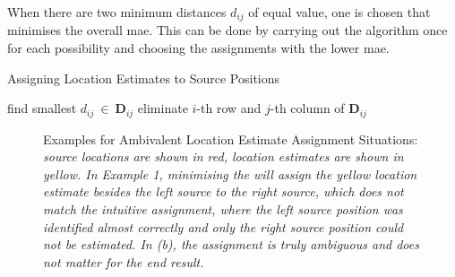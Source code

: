When there are two minimum distances $d_{ij}$ of equal value, one is chosen that minimises the overall \gls{mae}. This can be done by carrying out the algorithm once for each possibility and choosing the assignments with the lower \gls{mae}.
\begin{algorithm}[!htb]
\caption{Assigning Location Estimates to Source Positions}
\label{alg:assignment}
\begin{algorithmic}
    \State find smallest $d_{ij}\ \in\ \bm{D}_{ij}$ 
    \State eliminate $i$-th row and $j$-th column of $\bm{D}_{ij}$
    \EndWhile
\end{algorithmic}
\end{algorithm}

\begin{figure}[H]
	\setlength{\figureheight}{6cm}
%        

\iftoggle{quick}{%
    \texttt{[image: plots/assignment/assignment-both-screenshot]}
}{
	\begin{subfigure}{0.49\textwidth}
	\centering
	     \footnotesize
        \setlength{\figurewidth}{0.8\textwidth}
        
		\caption{Difficult Assignment}
	\end{subfigure}
	\begin{subfigure}{0.49\textwidth}
	\centering
		 \footnotesize
		 \setlength{\figurewidth}{0.8\textwidth}
        
		\caption{Ambiguous Assignment}
	\end{subfigure}
}
	\caption[Examples for Ambiguous Location Estimate Assignment Situations]{Examples for Ambivalent Location Estimate Assignment Situations: \itshape source locations are shown in red, location estimates are shown in yellow. In Example 1, minimising the  will assign the yellow location estimate besides the left source to the right source, which does not match the intuitive assignment, where the left source position was identified almost correctly and only the right source position could not be estimated. In (b), the assignment is truly ambiguous and does not matter for the end result.}
	\label{fig:assignmentExamples}
\end{figure}

